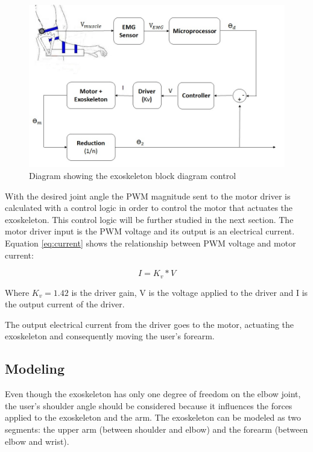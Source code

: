 \begin{figure}[thpb]
      \centering
      \includegraphics[scale=0.5]{Images/Exoskeleton_System.jpg}
      \caption{Diagram showing the exoskeleton block diagram control}
      \label{exoskeleton system}
   \end{figure}
   
   With the desired joint angle the PWM magnitude sent to the motor driver is calculated with a control logic in order to control the motor that actuates the exoskeleton. This control logic will be further studied in the next section. The motor driver input is the PWM voltage and its output is an electrical current. Equation \ref{eq:current} shows the relationship between PWM voltage and motor current:
   
   \begin{equation}
\label{eq:current}
I = K_v*V
\end{equation}

Where \(K_v = 1.42\) is the driver gain, V is the voltage applied to the driver and I is the output current of the driver.

The output electrical current from the driver goes to the motor, actuating the exoskeleton and consequently moving the user’s forearm.

\subsection{Modeling}

Even though the exoskeleton has only one degree of freedom on the elbow joint, the user's shoulder angle should be considered because it influences the forces applied to the exoskeleton and the arm. The exoskeleton can be modeled as two segments: the upper arm (between shoulder and elbow) and the forearm (between elbow and wrist).

